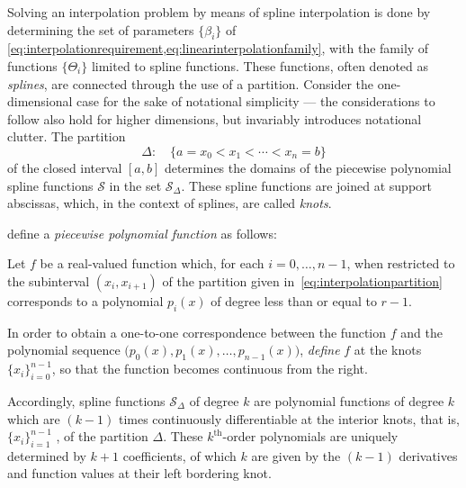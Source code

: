 Solving an interpolation problem by means of spline interpolation is done
by determining the set of parameters $\{\beta_{i}\}$ of
\cref{eq:interpolationrequirement,eq:linearinterpolationfamily}, with the
family of functions $\{\Theta_{i}\}$ limited to spline functions. These
functions, often denoted as \emph{splines}, are connected through the use
of a partition. Consider the one-dimensional case for the sake of notational
simplicity --- the considerations to follow also hold for higher dimensions,
but invariably introduces notational clutter. The partition
\begin{equation}
    \label{eq:interpolationpartition}
    \Delta : \quad \{a = x_{0} < x_{1} < \cdots < x_{n} = b\}
\end{equation}
of the closed interval $[a,b]$ determines the domains of the piecewise
polynomial spline functions $\mathcal{S}$ in the set $\mathcal{S}_{\Delta}$.
These spline functions are joined at support abscissas, which, in the context
of splines, are called \emph{knots}.

\textcite[p.107]{stoer2002introduction} define a
\emph{piecewise polynomial function} as follows:
\begin{defn}
    \label{def:piecewise_polynomial}
    Let $f$ be a real-valued function which, for each $i=0,\ldots,n-1$, when
    restricted to the subinterval $(x_{i},x_{i+1})$ of the partition given
    in~\cref{eq:interpolationpartition} corresponds to a polynomial
    $p_{i}(x)$ of degree less than or equal to $r-1$.

    \vspace{-0.8\baselineskip}
    In order to obtain a one-to-one correspondence between the function $f$ and
    the polynomial sequence $\big(p_{0}(x),p_{1}(x),\ldots,p_{n-1}(x)\big)$,
    \emph{define} $f$ at the knots $\{x_{i}\}_{i=0}^{n-1}$, so that the
    function becomes continuous from the right.
\end{defn}

Accordingly, spline functions $\mathcal{S}_{\Delta}$ of degree $k$ are
polynomial functions of degree $k$ which are $(k-1)$ times continuously
differentiable at the interior knots, that is, $\{x_{i}\}_{i=1}^{n-1}$ , of the
partition $\Delta$. These $k^{\text{th}}$-order polynomials are uniquely
determined by $k+1$ coefficients, of which $k$ are given by the $(k-1)$
derivatives and function values at their left bordering knot.



